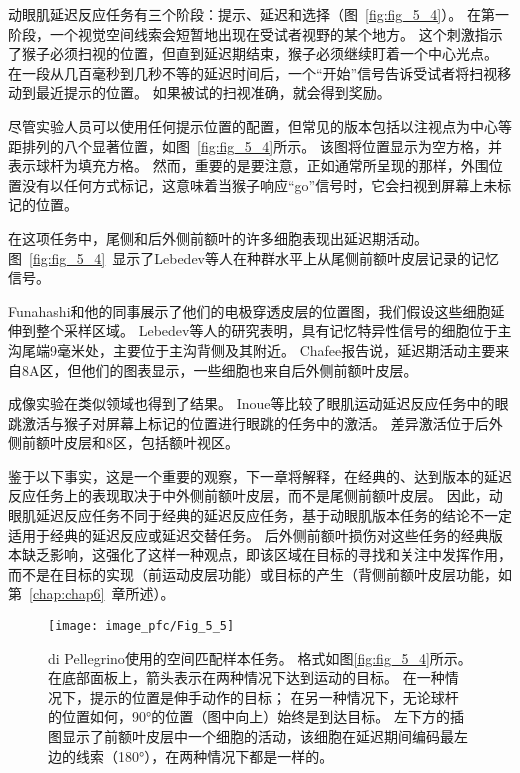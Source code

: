 动眼肌延迟反应任务有三个阶段：提示、延迟和选择（图~\ref{fig:fig_5_4}）。
在第一阶段，一个视觉空间线索会短暂地出现在受试者视野的某个地方。
这个刺激指示了猴子必须扫视的位置，但直到延迟期结束，猴子必须继续盯着一个中心光点。
在一段从几百毫秒到几秒不等的延迟时间后，一个“开始”信号告诉受试者将扫视移动到最近提示的位置。
如果被试的扫视准确，就会得到奖励。


尽管实验人员可以使用任何提示位置的配置，但常见的版本包括以注视点为中心等距排列的八个显著位置，如图~\ref{fig:fig_5_4}所示。
该图将位置显示为空方格，并表示球杆为填充方格。
然而，重要的是要注意，正如通常所呈现的那样，外围位置没有以任何方式标记，这意味着当猴子响应“go”信号时，它会扫视到屏幕上未标记的位置。


在这项任务中，尾侧和后外侧前额叶的许多细胞表现出延迟期活动\cite{chafee1998matching}。
图~\ref{fig:fig_5_4}~显示了Lebedev等人\cite{lebedev2004representation}在种群水平上从尾侧前额叶皮层记录的记忆信号。


Funahashi和他的同事\cite{funahashi1989mnemonic,takeda2002prefrontal}展示了他们的电极穿透皮层的位置图，我们假设这些细胞延伸到整个采样区域。
Lebedev等人的研究表明，具有记忆特异性信号的细胞位于主沟尾端9毫米处，主要位于主沟背侧及其附近。
Chafee\cite{chafee1998matching}报告说，延迟期活动主要来自8A区，但他们的图表显示，一些细胞也来自后外侧前额叶皮层。


成像实验在类似领域也得到了结果。
Inoue等\cite{inoue2004functional}比较了眼肌运动延迟反应任务中的眼跳激活与猴子对屏幕上标记的位置进行眼跳的任务中的激活。
差异激活位于后外侧前额叶皮层和8区，包括额叶视区。


鉴于以下事实，这是一个重要的观察，下一章将解释，在经典的、达到版本的延迟反应任务上的表现取决于中外侧前额叶皮层，而不是尾侧前额叶皮层。
因此，动眼肌延迟反应任务不同于经典的延迟反应任务，基于动眼肌版本任务的结论不一定适用于经典的延迟反应或延迟交替任务。
后外侧前额叶损伤对这些任务的经典版本缺乏影响\cite{butters1969retention}，这强化了这样一种观点，即该区域在目标的寻找和关注中发挥作用，而不是在目标的实现（前运动皮层功能）或目标的产生（背侧前额叶皮层功能，如第~\ref{chap:chap6}~章所述）。


\begin{figure}
	\centering
	\texttt{[image: image\_pfc/Fig\_5\_5]}
	\caption{di Pellegrino\cite{di1993visuospatial}使用的空间匹配样本任务。
		格式如图\ref{fig:fig_5_4}所示。
		在底部面板上，箭头表示在两种情况下达到运动的目标。
		在一种情况下，提示的位置是伸手动作的目标；
		在另一种情况下，无论球杆的位置如何，90°的位置（图中向上）始终是到达目标。
		左下方的插图显示了前额叶皮层中一个细胞的活动，该细胞在延迟期间编码最左边的线索（180°），在两种情况下都是一样的。}
	\label{fig:fig_5_5}
\end{figure}


